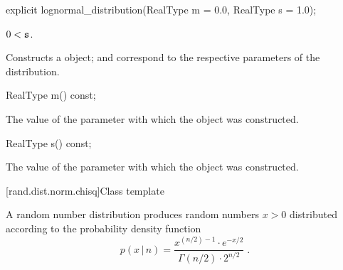 %
\begin{itemdecl}
explicit lognormal_distribution(RealType m = 0.0, RealType s = 1.0);
\end{itemdecl}

\begin{itemdescr}
\pnum\requires
 $ 0 < \texttt{\protect s} $.

\pnum\effects Constructs a  object;
  and 
 correspond to the respective parameters of the distribution.
\end{itemdescr}

%
\begin{itemdecl}
RealType m() const;
\end{itemdecl}

\begin{itemdescr}
\pnum\returns The value of the  parameter
 with which the object was constructed.
\end{itemdescr}

%
\begin{itemdecl}
RealType s() const;
\end{itemdecl}

\begin{itemdescr}
\pnum\returns The value of the  parameter
 with which the object was constructed.
\end{itemdescr}


[rand.dist.norm.chisq]{Class template }%
%
%

\pnum
A  random number distribution
produces random numbers $x>0$
distributed according to
the probability density function%
%
%
\[%
 p(x\,|\,n)
      =  \frac{ x^{(n/2)-1} \cdot e^{-x/2}}
              {\Gamma(n/2) \cdot 2^{n/2}}
\; \mbox{.}
\]

